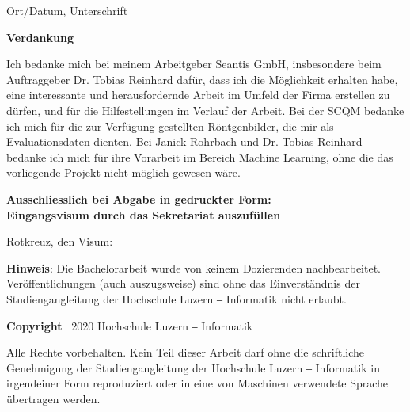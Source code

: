 {Ort/Datum, Unterschrift \hspace{0.25cm} \underline{\hspace*{9cm}} 

\textbf{Verdankung}

Ich bedanke mich bei meinem Arbeitgeber Seantis GmbH, insbesondere beim Auftraggeber Dr. Tobias Reinhard dafür, dass ich die Möglichkeit erhalten habe, eine interessante und herausfordernde Arbeit im Umfeld der Firma erstellen zu dürfen, und für die Hilfestellungen im Verlauf der Arbeit. Bei der SCQM bedanke ich mich für die zur Verfügung gestellten Röntgenbilder, die mir als Evaluationsdaten dienten. Bei Janick Rohrbach und Dr. Tobias Reinhard bedanke ich mich für ihre Vorarbeit im Bereich Machine Learning, ohne die das vorliegende Projekt nicht möglich gewesen wäre.

{\textbf{Ausschliesslich bei Abgabe in gedruckter Form:\\
Eingangsvisum durch das Sekretariat auszufüllen}}

Rotkreuz, den \underline{\hspace*{4cm}} \hspace*{1cm} Visum: \underline{\hspace*{4cm}}

\vspace*{\fill}

{
\small
\setlength{\parskip}{11pt}
{\textbf{Hinweis}}: Die Bachelorarbeit wurde von keinem Dozierenden nachbearbeitet. Veröffentlichungen (auch auszugsweise) sind ohne das Einverständnis der Studiengangleitung der Hochschule Luzern ‒ Informatik nicht erlaubt.

\textbf{Copyright} \textcopyright\ 2020 Hochschule Luzern ‒ Informatik

Alle Rechte vorbehalten. Kein Teil dieser Arbeit darf ohne die schriftliche Genehmigung der Studiengangleitung der Hochschule Luzern ‒ Informatik in irgendeiner Form reproduziert oder in eine von Maschinen verwendete Sprache übertragen werden.
}

} %
